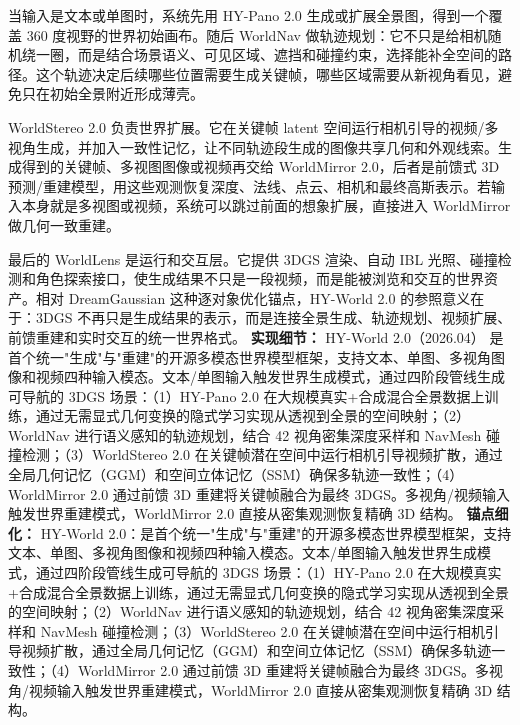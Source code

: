 当输入是文本或单图时，系统先用 HY-Pano 2.0 生成或扩展全景图，得到一个覆盖 360 度视野的世界初始画布。随后 WorldNav 做轨迹规划：它不只是给相机随机绕一圈，而是结合场景语义、可见区域、遮挡和碰撞约束，选择能补全空间的路径。这个轨迹决定后续哪些位置需要生成关键帧，哪些区域需要从新视角看见，避免只在初始全景附近形成薄壳。

WorldStereo 2.0 负责世界扩展。它在关键帧 latent 空间运行相机引导的视频/多视角生成，并加入一致性记忆，让不同轨迹段生成的图像共享几何和外观线索。生成得到的关键帧、多视图图像或视频再交给 WorldMirror 2.0，后者是前馈式 3D 预测/重建模型，用这些观测恢复深度、法线、点云、相机和最终高斯表示。若输入本身就是多视图或视频，系统可以跳过前面的想象扩展，直接进入 WorldMirror 做几何一致重建。

最后的 WorldLens 是运行和交互层。它提供 3DGS 渲染、自动 IBL 光照、碰撞检测和角色探索接口，使生成结果不只是一段视频，而是能被浏览和交互的世界资产。相对 DreamGaussian 这种逐对象优化锚点，HY-World 2.0 的参照意义在于：3DGS 不再只是生成结果的表示，而是连接全景生成、轨迹规划、视频扩展、前馈重建和实时交互的统一世界格式。
\textbf{实现细节：} HY-World 2.0（2026.04） 是首个统一"生成"与"重建"的开源多模态世界模型框架，支持文本、单图、多视角图像和视频四种输入模态。文本/单图输入触发世界生成模式，通过四阶段管线生成可导航的 3DGS 场景：（1）HY-Pano 2.0 在大规模真实+合成混合全景数据上训练，通过无需显式几何变换的隐式学习实现从透视到全景的空间映射；（2）WorldNav 进行语义感知的轨迹规划，结合 42 视角密集深度采样和 NavMesh 碰撞检测；（3）WorldStereo 2.0 在关键帧潜在空间中运行相机引导视频扩散，通过全局几何记忆（GGM）和空间立体记忆（SSM）确保多轨迹一致性；（4）WorldMirror 2.0 通过前馈 3D 重建将关键帧融合为最终 3DGS。多视角/视频输入触发世界重建模式，WorldMirror 2.0 直接从密集观测恢复精确 3D 结构。
\textbf{锚点细化：} HY-World 2.0：是首个统一"生成"与"重建"的开源多模态世界模型框架，支持文本、单图、多视角图像和视频四种输入模态。文本/单图输入触发世界生成模式，通过四阶段管线生成可导航的 3DGS 场景：（1）HY-Pano 2.0 在大规模真实+合成混合全景数据上训练，通过无需显式几何变换的隐式学习实现从透视到全景的空间映射；（2）WorldNav 进行语义感知的轨迹规划，结合 42 视角密集深度采样和 NavMesh 碰撞检测；（3）WorldStereo 2.0 在关键帧潜在空间中运行相机引导视频扩散，通过全局几何记忆（GGM）和空间立体记忆（SSM）确保多轨迹一致性；（4）WorldMirror 2.0 通过前馈 3D 重建将关键帧融合为最终 3DGS。多视角/视频输入触发世界重建模式，WorldMirror 2.0 直接从密集观测恢复精确 3D 结构。

